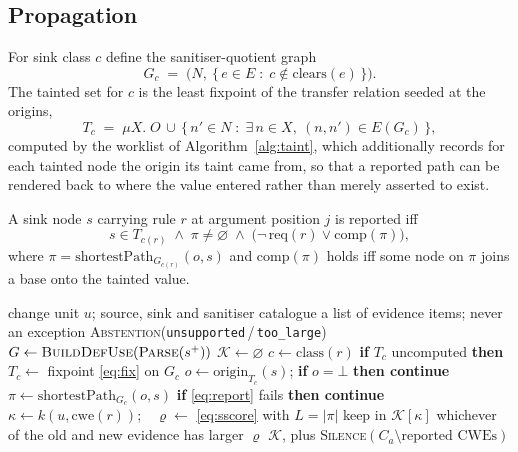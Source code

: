 \documentclass[conference]{IEEEtran}
\newcommand{\Unit}{u}
\begin{document}
\subsection{Propagation}
For sink class $c$ define the sanitiser-quotient graph
\begin{equation}
G_c \;=\; \bigl(N,\ \{\,e \in E \;:\; c \notin \mathrm{clears}(e)\,\}\bigr).
\end{equation}
The tainted set for $c$ is the least fixpoint of the transfer relation seeded at the origins,
\begin{equation}
T_c \;=\; \mu X.\; O \,\cup\, \{\, n' \in N \;:\; \exists\, n \in X,\ (n,n') \in E(G_c) \,\},
\label{eq:fix}
\end{equation}
computed by the worklist of Algorithm~\ref{alg:taint}, which additionally records for each
tainted node the origin its taint came from, so that a reported path can be rendered back to
where the value entered rather than merely asserted to exist.

A sink node $s$ carrying rule $r$ at argument position $j$ is reported iff
\begin{equation}
s \in T_{c(r)} \;\wedge\; \pi \neq \varnothing \;\wedge\; \bigl(\neg\,\mathrm{req}(r) \vee \mathrm{comp}(\pi)\bigr),
\label{eq:report}
\end{equation}
where $\pi=\mathrm{shortestPath}_{G_{c(r)}}(o,s)$ and $\mathrm{comp}(\pi)$ holds iff some
node on $\pi$ joins a base onto the tainted value.

\begin{algorithm}[t]
\caption{\textsc{StructuralTaint}$(\Unit)$}
\label{alg:taint}
\begin{algorithmic}[1]
\Require change unit $\Unit$; source, sink and sanitiser catalogue
\Ensure a list of evidence items; never an exception
  \State \Return \textsc{Abstention}(\texttt{unsupported}\,/\,\texttt{too\_large})
\EndIf
\State $G \gets \textsc{BuildDefUse}(\textsc{Parse}(s^{+}))$
\State $\mathcal{K} \gets \varnothing$ 
  \State $c \gets \mathrm{class}(r)$
  \State \textbf{if} $T_c$ uncomputed \textbf{then} $T_c \gets$ fixpoint \eqref{eq:fix} on $G_c$
  \State $o \gets \mathrm{origin}_{T_c}(s)$; \textbf{if} $o=\bot$ \textbf{then continue}
  \State $\pi \gets \mathrm{shortestPath}_{G_c}(o,s)$
  \State \textbf{if} \eqref{eq:report} fails \textbf{then continue}
  \State $\kappa \gets k(\Unit,\mathrm{cwe}(r))$;\ \ $\varrho \gets$ \eqref{eq:sscore} with $L=|\pi|$
  \State keep in $\mathcal{K}[\kappa]$ whichever of the old and new evidence has larger $\varrho$
\EndFor
\State \Return $\mathcal{K}$, plus \textsc{Silence}$(C_a \setminus \text{reported CWEs})$
\end{algorithmic}
\end{algorithm}
\end{document}

